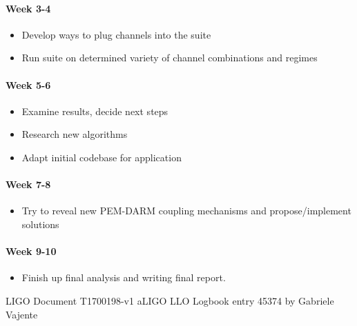 \documentclass[colorlinks=true,pdfstartview=FitV,linkcolor=blue,
            citecolor=red,urlcolor=magenta]{ligodoc}
\begin{document}
\paragraph{Week 3-4}
\begin{itemize}
\item Develop ways to plug channels into the suite
\item Run suite on determined variety of channel combinations and regimes
\end{itemize}
\paragraph{Week 5-6}
\begin{itemize}
\item Examine results, decide next steps
\item Research new algorithms
\item Adapt initial codebase for application
\end{itemize}
\paragraph{Week 7-8}
\begin{itemize}
\item Try to reveal new PEM-DARM coupling mechanisms and propose/implement solutions
\end{itemize}
\paragraph{Week 9-10}
\begin{itemize}
\item Finish up final analysis and writing final report.
\end{itemize}

\begin{thebibliography}{2}
 LIGO Document T1700198-v1
 aLIGO LLO Logbook entry 45374 by Gabriele Vajente
\end{thebibliography}
\end{document}
